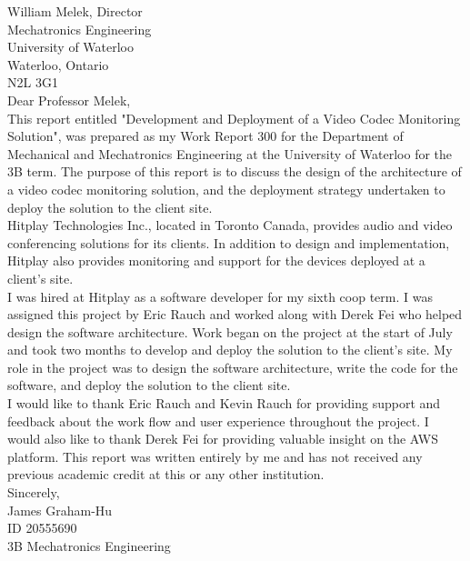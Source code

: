 \documentclass[letterpaper,12pt]{article}
\begin{document}
William Melek, Director\\
Mechatronics Engineering\\
University of Waterloo\\
Waterloo, Ontario\\
N2L 3G1\\

Dear Professor Melek,\\

This report entitled "Development and Deployment of a Video Codec Monitoring Solution", was prepared as my Work Report 300 for the Department of Mechanical and Mechatronics Engineering at the University of Waterloo for the 3B term. The purpose of this report is to discuss the design of the architecture of a video codec monitoring solution, and the deployment strategy undertaken to deploy the solution to the client site.\\

Hitplay Technologies Inc., located in Toronto Canada, provides audio and video conferencing solutions for its clients. In addition to design and implementation, Hitplay also provides monitoring and support for the devices deployed at a client's site.\\

I was hired at Hitplay as a software developer for my sixth coop term. I was assigned this project by Eric Rauch and worked along with Derek Fei who helped design the software architecture. Work began on the project at the start of July and took two months to develop and deploy the solution to the client's site. My role in the project was to design the software architecture, write the code for the software, and deploy the solution to the client site.\\


I would like to thank Eric Rauch and Kevin Rauch for providing support and feedback about the work flow and user experience throughout the project. I would also like to thank Derek Fei for providing valuable insight on the AWS platform. This report was written entirely by  me and has not received any previous academic credit at this or any other institution.\\

Sincerely,\\

James Graham-Hu\\
ID 20555690\\
3B Mechatronics Engineering



\pagebreak
\tableofcontents
\setcounter{page}{1}
\pagebreak
\listoffigures
\pagebreak
\listoftables
\pagebreak
\end{document}
